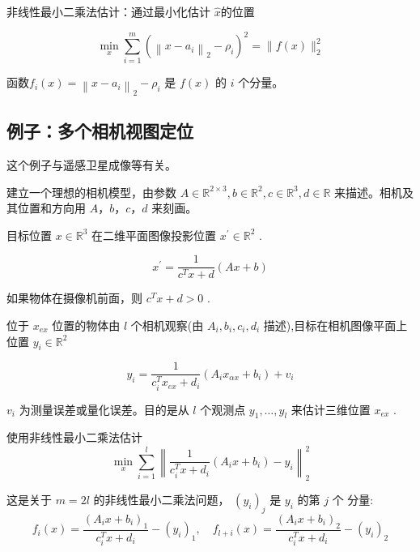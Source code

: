 非线性最小二乘法估计：通过最小化估计 $ \hat{x} $的位置

\begin{equation}
\min _{x} \sum_{i=1}^{m}\left(\left\|x-a_{i}\right\|_{2}-\rho_{i}\right)^{2}=\|f(x)\|_{2}^{2}
\end{equation}

函数$ f_{i}(x)=\left\|x-a_{i}\right\|_{2}-\rho_{i} $ 是 $ f(x) $ 的 $ i $ 个分量。


\subsection{例子：多个相机视图定位}

\begin{remark}
    这个例子与遥感卫星成像等有关。
\end{remark}

建立一个理想的相机模型，由参数 $ A \in \mathbb{R}^{2 \times 3}, b \in \mathbb{R}^{2}, c \in \mathbb{R}^{3}, d \in \mathbb{R} $ 来描述。相机及其位置和方向用 $ A ， b ， c ， d $ 来刻画。

目标位置 $ x \in \mathbb{R}^{3} $ 在二维平面图像投影位置 $ x^{\prime} \in \mathbb{R}^{2} $ .

\begin{equation}
x^{\prime}=\frac{1}{c^{T} x+d}(A x+b)
\end{equation}

如果物体在摄像机前面，则 $ c^{T} x+d>0 $ .

\begin{problem}
    位于 $ x_{e x} $ 位置的物体由 $ l $ 个相机观察(由 $ A_{i}, b_{i}, c_{i}, d_{i} $ 描述),目标在相机图像平面上位置 $ y_{i} \in \mathbb{R}^{2} $

    \begin{equation}
    y_{i}=\frac{1}{c_{i}^{T} x_{e x}+d_{i}}\left(A_{i} x_{\alpha x}+b_{i}\right)+v_{i}
    \end{equation}

    $ v_{i} $ 为测量误差或量化误差。目的是从 $ l $ 个观测点 $ y_{1}, \ldots, y_{l} $ 来估计三维位置 $ x_{e x} $ .
\end{problem}


使用非线性最小二乘法估计
\begin{equation}
\min _{x} \sum_{i=1}^{l}\left\|\frac{1}{c_{i}^{T} x+d_{i}}\left(A_{i} x+b_{i}\right)-y_{i}\right\|_{2}^{2}
\end{equation}

这是关于 $ m=2 l $ 的非线性最小二乘法问题， $ \left(y_{i}\right)_{j} $ 是 $ y_{i} $ 的第 $ j $ 个 分量:
\begin{equation}
f_{i}(x)=\frac{\left(A_{i} x+b_{i}\right)_{1}}{c_{i}^{T} x+d_{i}}-\left(y_{i}\right)_{1}, \quad f_{l+i}(x)=\frac{\left(A_{i} x+b_{i}\right)_{2}}{c_{i}^{T} x+d_{i}}-\left(y_{i}\right)_{2}
\end{equation}

